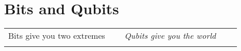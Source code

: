 \section*{Bits and Qubits}

\begin{tabular}{p{0.45\linewidth}p{0.45\linewidth}}
  Bits give you two extremes
  & \emph{Qubits give you the world}%
  \\%
  \multicolumn{1}{c}{}%
  & \multicolumn{1}{c}{}%
\end{tabular}



